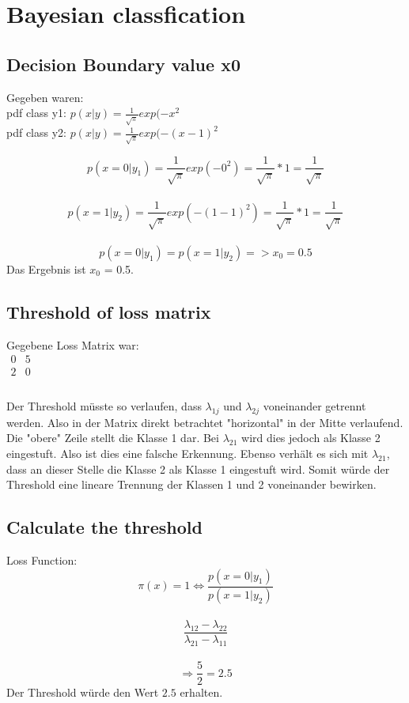 \documentclass{article}
\begin{document}
\section{Bayesian classfication}
\subsection{Decision Boundary value x0}
Gegeben waren:\\
pdf class y1: $p(x|y) =  \frac{1}{\sqrt{\pi}}exp(-x^2 $ \\
pdf class y2: $ p(x|y) =  \frac{1}{\sqrt{\pi}}exp(-(x-1)^2 $

\[
p(x=0|y_1) = \frac{1}{\sqrt{\pi}}exp(-0^2) = \frac{1}{\sqrt{\pi}} * 1 = \frac{1}{\sqrt{\pi}}
\]\\
\[
p(x=1|y_2) = \frac{1}{\sqrt{\pi}}exp(-(1-1)^2) = \frac{1}{\sqrt{\pi}} * 1 = \frac{1}{\sqrt{\pi}}
\]\\
\[
p(x=0|y_1) = p(x=1|y_2) => x_0 = 0.5
\]
Das Ergebnis ist $x_0$ = 0.5.

\subsection{Threshold of loss matrix}
Gegebene Loss Matrix war:\\
$
\begin{matrix}
	0 & 5\\
	2 & 0\\
\end{matrix}
$\\\\
Der Threshold müsste so verlaufen, dass $\lambda_{1j}$ und $\lambda_{2j}$ voneinander getrennt werden. Also in der Matrix direkt betrachtet "horizontal" in der Mitte verlaufend. Die "obere" Zeile stellt die Klasse 1 dar. Bei $\lambda_{21}$ wird dies jedoch als Klasse 2 eingestuft. Also ist dies eine falsche Erkennung. Ebenso verhält es sich mit $\lambda_{21}$, dass an dieser Stelle die Klasse 2 als Klasse 1 eingestuft wird. Somit würde der Threshold eine lineare Trennung der Klassen 1 und 2 voneinander bewirken.

\subsection{Calculate the threshold}
Loss Function:
\[ \pi(x) = 1 \Leftrightarrow \frac{p(x=0|y_1)}{p(x=1|y_2)} \]\\
\[\frac{\lambda_{12} - \lambda_{22}}{\lambda_{21} - \lambda_{11}}\]\\
\[\Rightarrow \frac{5}{2} = 2.5 \]
Der Threshold würde den Wert $2.5$ erhalten.
\end{document}
